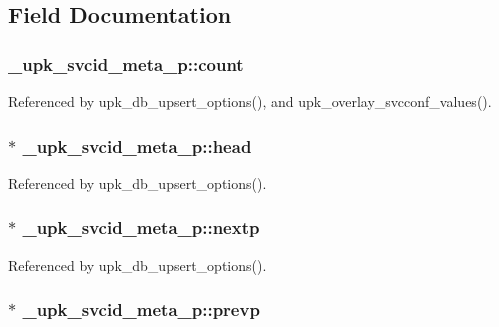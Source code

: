 \subsection{Field Documentation}
\subsubsection[{count}]{ {\bf \_\-upk\_\-svcid\_\-meta\_\-p::count}}\label{struct__upk__svcid__meta__p_aae310db442be3e2048b4e2120a52b90a}


Referenced by upk\_\-db\_\-upsert\_\-options(), and upk\_\-overlay\_\-svcconf\_\-values().

\subsubsection[{head}]{ $\ast$ {\bf \_\-upk\_\-svcid\_\-meta\_\-p::head}}\label{struct__upk__svcid__meta__p_a248fb8c8d571b7ba64da260fd8c0bff9}


Referenced by upk\_\-db\_\-upsert\_\-options().

\subsubsection[{nextp}]{ $\ast$ {\bf \_\-upk\_\-svcid\_\-meta\_\-p::nextp}}\label{struct__upk__svcid__meta__p_ae7256ecdb68a159a1efa703c50f5d468}


Referenced by upk\_\-db\_\-upsert\_\-options().

\subsubsection[{prevp}]{ $\ast$ {\bf \_\-upk\_\-svcid\_\-meta\_\-p::prevp}}\label{struct__upk__svcid__meta__p_a65ccf0bbc55c6955efea37e794eea602}


